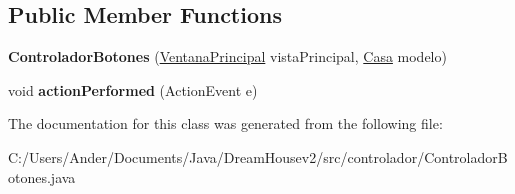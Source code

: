 \subsection*{Public Member Functions}
\begin{DoxyCompactItemize}
\item 
\mbox{\label{classcontrolador_1_1_controlador_botones_ad14c7f5b59b1e67e9af9019f7e309432}} 
{\bfseries Controlador\+Botones} (\mbox{\hyperlink{classvista_1_1_ventana_principal}{Ventana\+Principal}} vista\+Principal, \mbox{\hyperlink{classmodelo_1_1_casa}{Casa}} modelo)
\item 
\mbox{\label{classcontrolador_1_1_controlador_botones_a73a3073a9dd8e1d62ba20831005ecb48}} 
void {\bfseries action\+Performed} (Action\+Event e)
\end{DoxyCompactItemize}


The documentation for this class was generated from the following file\+:\begin{DoxyCompactItemize}
\item 
C\+:/\+Users/\+Ander/\+Documents/\+Java/\+Dream\+Housev2/src/controlador/Controlador\+Botones.\+java\end{DoxyCompactItemize}
